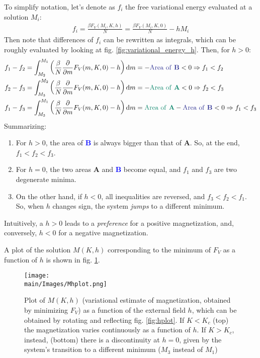 \documentclass[../../main.tex]{subfiles}
\begin{document}
To simplify notation, let's denote as $f_i$ the free variational energy evaluated at a solution $M_i$:
\begin{align*}
    f_i = \frac{\beta F_V(M_i, K, h)}{N} = \frac{\beta F_V(M_i, K, 0)}{N} - hM_i  
\end{align*}
Then note that differences of $f_i$ can be rewritten as integrals, which can be roughly evaluated by looking at fig. \ref{fig:variational_energy_h}. Then, for $h > 0$:
\begin{align*}
    f_1 - f_2 &= \int_{M_2}^{M_1} \left(\frac{\beta}{N} \pdv{m} F_V(m, K, 0) - h\right) \dd{m} = -\text{\textcolor{Blue}{Area of \textbf{B}}} < 0 \Rightarrow f_1 < f_2\\
    f_2 - f_3 &= \int_{M_3}^{M_2} \left(\frac{\beta}{N} \pdv{m} F_V(m, K, 0) - h\right) \dd{m} = -\text{\textcolor{PineGreen}{Area of \textbf{A}}} < 0 \Rightarrow f_2 < f_3\\
    f_1-f_3 &= \int_{M_3}^{M_1} \left(\frac{\beta}{N} \pdv{m} F_V(m, K, 0) - h\right) \dd{m} = \text{\textcolor{PineGreen}{Area of \textbf{A}}}-\text{\textcolor{Blue}{Area of \textbf{B}}} < 0 \Rightarrow f_1 < f_3\\
\end{align*}
Summarizing:
\begin{enumerate}
    \item For $h > 0$, the area of \textbf{\textcolor{Blue}{B}} is always bigger than that of \textbf{\textcolor{PineGreen}{A}}. So, at the end, $f_1 < f_2 < f_3$.
    \item For $h = 0$, the two areas \textbf{\textcolor{PineGreen}{A}} and \textbf{\textcolor{Blue}{B}} become equal, and $f_1$ and $f_3$ are two degenerate minima. 
    \item On the other hand, if $h < 0$, all inequalities are reversed, and $f_3 < f_2 < f_1$. So, when $h$ changes sign, the system \textit{jumps} to a different minimum. 
\end{enumerate}

Intuitively, a $h > 0$ leads to a \textit{preference} for a positive magnetization, and, conversely, $h < 0$ for a negative magnetization. 

\medskip

A plot of the solution $M(K,h)$ corresponding to the minimum of $F_V$ as a function of $h$ is shown in fig. \ref{fig:Mhplot}.

\begin{figure}[H]
    \centering
    \texttt{[image: \\main/Images/Mhplot.png]}
    \caption{
    Plot of $M(K,h)$ (variational estimate of magnetization, obtained by minimizing $F_V$) as a function of the external field $h$, which can be obtained by rotating and reflecting fig. \ref{fig:hplot}.    
    If $K < K_c$ (top) the magnetization varies continuously as a function of $h$. If $K > K_c$, instead, (bottom) there is a discontinuity at $h=0$, given by the system's transition to a different minimum ($M_3$ instead of $M_1$)}
    \label{fig:Mhplot}
\end{figure}
\end{document}
